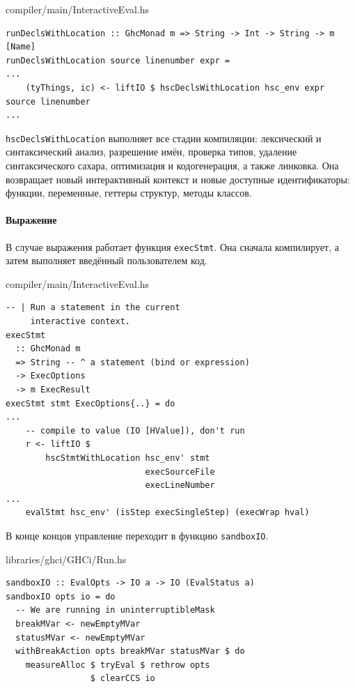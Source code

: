 \documentclass[fontsize=14pt, paper=a4, pagesize, DIV=calc]{scrartcl}
\def\code#1{\texttt{#1}}
\begin{document}
\begin{ListingEnv}
\caption{compiler/main/InteractiveEval.hs}
\begin{lstlisting}[firstnumber=199]
runDeclsWithLocation :: GhcMonad m => String -> Int -> String -> m [Name]
runDeclsWithLocation source linenumber expr =
...
    (tyThings, ic) <- liftIO $ hscDeclsWithLocation hsc_env expr source linenumber
...
\end{lstlisting}
\end{ListingEnv}

\code{hscDeclsWithLocation} выполняет все стадии компиляции: лексический и
синтаксический анализ, разрешение имён, проверка типов, удаление
синтаксического сахара, оптимизация и кодогенерация, а также линковка.  Она
возвращает новый интерактивный контекст и новые доступные идентификаторы:
функции, переменные, геттеры структур, методы классов.

\paragraph{Выражение}

В случае выражения работает функция \code{execStmt}. Она сначала компилирует, а
затем выполняет введённый пользователем код.

\begin{ListingEnv}
\caption{compiler/main/InteractiveEval.hs}
\begin{lstlisting}
-- | Run a statement in the current 
     interactive context.
execStmt
  :: GhcMonad m
  => String -- ^ a statement (bind or expression)
  -> ExecOptions
  -> m ExecResult
execStmt stmt ExecOptions{..} = do
...
    -- compile to value (IO [HValue]), don't run
    r <- liftIO $ 
        hscStmtWithLocation hsc_env' stmt 
                            execSourceFile 
                            execLineNumber
...
    evalStmt hsc_env' (isStep execSingleStep) (execWrap hval)
\end{lstlisting}
\end{ListingEnv}

В конце концов управление переходит в функцию \code{sandboxIO}.

\begin{ListingEnv}
\caption{libraries/ghci/GHCi/Run.hs}
\begin{lstlisting}[numbers=none]
sandboxIO :: EvalOpts -> IO a -> IO (EvalStatus a)
sandboxIO opts io = do
  -- We are running in uninterruptibleMask
  breakMVar <- newEmptyMVar
  statusMVar <- newEmptyMVar
  withBreakAction opts breakMVar statusMVar $ do
    measureAlloc $ tryEval $ rethrow opts 
                 $ clearCCS io
\end{lstlisting}
\end{ListingEnv}
\end{document}

